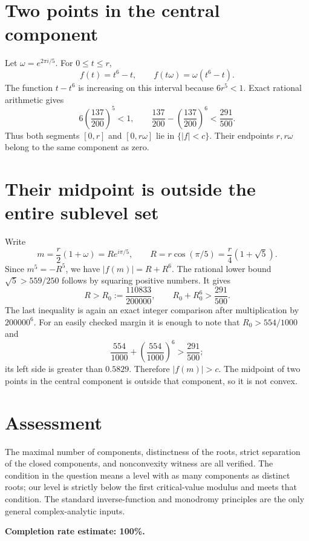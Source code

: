 \documentclass[11pt]{article}
\begin{document}
\section*{Two points in the central component}
Let $\omega=e^{2\pi i/5}$. For $0\le t\le r$,
\[
 f(t)=t^6-t,\qquad f(t\omega)=\omega(t^6-t).
\]
The function $t-t^6$ is increasing on this interval because $6r^5<1$. Exact rational arithmetic gives
\[
 6\left(\frac{137}{200}\right)^5<1,
 \qquad
 \frac{137}{200}-\left(\frac{137}{200}\right)^6
 <\frac{291}{500}.
\tag{3}
\]
Thus both segments $[0,r]$ and $[0,r\omega]$ lie in $\{|f|<c\}$. Their endpoints $r,r\omega$ belong to the same component as zero.

\section*{Their midpoint is outside the entire sublevel set}
Write
\[
 m=\frac r2(1+\omega)=R e^{i\pi/5},\qquad
 R=r\cos(\pi/5)=\frac r4(1+\sqrt5).
\]
Since $m^5=-R^5$, we have $|f(m)|=R+R^6$. The rational lower bound $\sqrt5>559/250$ follows by squaring positive numbers. It gives
\[
 R>R_0:=\frac{110833}{200000},\qquad
 R_0+R_0^6>\frac{291}{500}.\tag{4}
\]
The last inequality is again an exact integer comparison after multiplication by $200000^6$. For an easily checked margin it is enough to note that $R_0>554/1000$ and
\[
 \frac{554}{1000}+\left(\frac{554}{1000}\right)^6
 >\frac{291}{500};
\]
its left side is greater than $0.5829$. Therefore $|f(m)|>c$. The midpoint of two points in the central component is outside that component, so it is not convex.

\section*{Assessment}
The maximal number of components, distinctness of the roots, strict separation of the closed components, and nonconvexity witness are all verified. The condition in the question means a level with as many components as distinct roots; our level is strictly below the first critical-value modulus and meets that condition. The standard inverse-function and monodromy principles are the only general complex-analytic inputs.

\textbf{Completion rate estimate: 100\%.}
\end{document}
